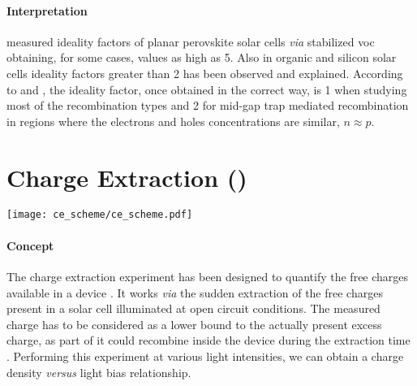 		\paragraph{Interpretation} %
		 measured ideality factors of planar perovskite solar cells \textsl{via} stabilized \gls{voc} obtaining, for some cases, values as high as 5.
		Also in organic \cite{Kirchartz2011,Kirchartz2012} and silicon solar cells \cite{Breitenstein2006} ideality factors greater than 2 has been observed and explained.
		According to  and , the ideality factor, once obtained in the correct way, is 1 when studying most of the recombination types and 2 for mid-gap trap mediated recombination in regions where the electrons and holes concentrations are similar, $n \approx p$.

		\FloatBarrier
		\newpage
\section{Charge Extraction ()}

	\begin{SCfigure}
		\centering
		\texttt{[image: ce\_scheme/ce\_scheme.pdf]}
		\label{fig:ce_scheme}
	\end{SCfigure}


	\paragraph{Concept}
	The charge extraction experiment has been designed to quantify the free charges available in a device \cite{Duffy2000,Barnes2011}.
	It works \textsl{via} the sudden extraction of the free charges present in a solar cell illuminated at open circuit conditions.
	The measured charge has to be considered as a lower bound to the actually present excess charge, as part of it could recombine inside the device during the extraction time \cite{ORegan2005}.
	Performing this experiment at various light intensities, we can obtain a charge density \textsl{versus} light bias relationship.

